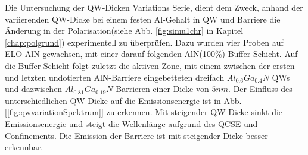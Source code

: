 Die Untersuchung der QW-Dicken Variations Serie, dient dem Zweck, anhand der variierenden QW-Dicke bei einem festen Al-Gehalt in QW und Barriere die Änderung in der Polarisation(siehe Abb. \ref{fig:simu1chr} in Kapitel \ref{chap:polgrund}) experimentell zu \"uberpr\"ufen. Dazu wurden vier Proben auf ELO-AlN gewachsen, mit einer darauf folgenden AlN(100\%) Buffer-Schicht. Auf die Buffer-Schicht folgt zuletzt die aktiven Zone, mit einem zwischen der ersten und letzten undotierten AlN-Barriere eingebetteten dreifach $Al_{0.6}Ga_{0.4}N$ QWs und dazwischen $Al_{0.81}Ga_{0.19}N$-Barrieren einer Dicke von $5nm$. 
Der Einfluss des unterschiedlichen QW-Dicke auf die Emissionsenergie ist in Abb. [\ref{fig:qwvariationSpektrum}] zu erkennen. Mit steigender QW-Dicke sinkt die Emissionsenergie und steigt die Wellenl\"ange aufgrund des QCSE und Confinements. Die Emission der Barriere ist mit steigender Dicke besser erkennbar. 
%
